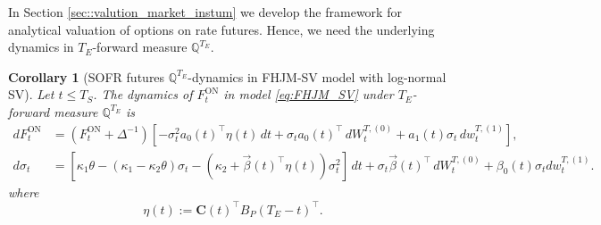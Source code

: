 \documentclass[pdftex,11pt,a4paper] {article}
\newtheorem{corollary}{Corollary}[section]
\begin{document}
In Section \ref{sec::valution_market_instum} we develop the framework for analytical valuation of options on rate futures. Hence, we need the underlying dynamics in $T_E$-forward measure $\mathbb{Q}^{T_E}$.  
\begin{corollary}[SOFR futures $\mathbb{Q}^{T_E}$-dynamics in FHJM-SV model with log-normal SV]\label{thm:futures_dynamics_logsv_fwd_meas}
Let $t\le T_S$. The dynamics of $F^{\mathrm{ON}}_t$ in model \eqref{eq:FHJM_SV} under $T_E$-forward measure $\mathbb{Q}^{T_E}$ is 
\begin{equation}\label{eq:futures_fwd_logsv}
\begin{split}
d F^{\mathrm{ON}}_t&=\left( F^{\mathrm{ON}}_t+\Delta^{-1}\right)\left[-\sigma_t^2a_0(t)^\top\eta(t)\,dt + \sigma_t a_0(t)^\top\,dW^{T, (0)}_t+ a_1(t)\sigma_t\,dw^{T, (1)}_t\right], \\
d\sigma_t&=[\kappa_1\theta-(\kappa_1-\kappa_2\theta)\sigma_t-(\kappa_2+\vec{\beta}(t)^\top\eta(t))\sigma_t^2]\,dt + \sigma_t\vec{\beta}(t)^\top\,dW^{T, (0)}_t+\beta_0(t)\sigma_tdw^{T, (1)}_t.
\end{split}
\end{equation}
where 
\begin{equation}\label{eq:futures_coeffs_eta}
\eta(t):=\mathbf{C}(t)^\top B_P(T_E-t)^\top.
\end{equation}

\end{corollary}
\end{document}
